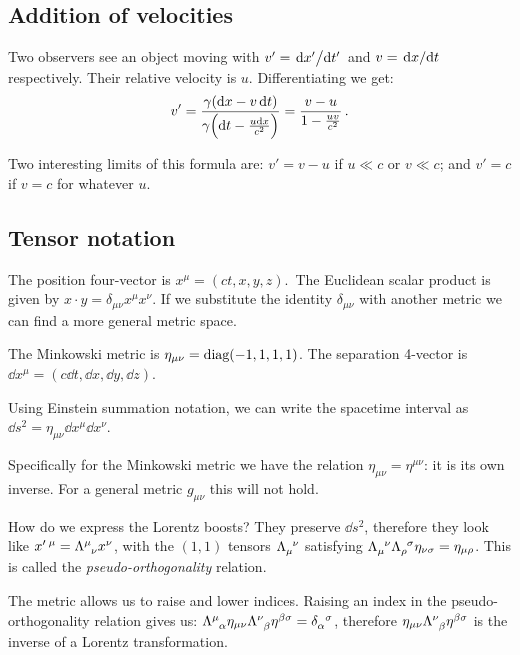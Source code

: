\documentclass[main.tex]{subfiles}
\begin{document}
\subsection{Addition of velocities}

Two observers see an object moving with \(v' = \dv*{x'}{t'}\) and  \(v = \dv*{x}{t}\) respectively. Their relative velocity is \(u\).
Differentiating we get:
%
\begin{equation}
  v' = \frac{\gamma (\dd{x} - v \dd{t})}{\gamma \qty(\dd{t} - \frac{u\dd{x}}{c^2} )} = \frac{v - u}{1 - \frac{uv}{c^2}}  \,.
\end{equation}

Two interesting limits of this formula are: \(v' = v - u\) if \(u \ll c\) or \(v \ll c\); and \(v'=c\) if \(v=c\) for whatever \(u\).

\subsection{Tensor notation}

The position four-vector is \(x^\mu = (ct, x, y, z)\).\
The Euclidean scalar product is given by \(x \cdot y = \delta_{\mu\nu} x^\mu x^\nu \).
If we substitute the identity \(\delta_{\mu\nu}\) with another metric we can find a more general metric space.

The Minkowski metric is \(\eta_{\mu\nu} = \text{diag}\qty(-1, 1, 1, 1)\).
The separation 4-vector is \(\dd{x^\mu} = (c\dd{t}, \dd{x}, \dd{y}, \dd{z})\).

Using Einstein summation notation, we can write the spacetime interval as \(\dd{s^2} = \eta_{\mu\nu} \dd{x^\mu} \dd{x^\nu}\).

Specifically for the Minkowski metric we have the relation \(\eta_{\mu\nu} = \eta^{\mu\nu}\): it is its own inverse.
For a general metric \(g_{\mu\nu}\) this will not hold.

How do we express the Lorentz boosts? They preserve \(\dd{s^2} \), therefore they look like \(x'\,^\mu = \tensor{\Lambda}{^\mu_\nu} x^\nu\), with the \((1, 1)\) tensors \(\tensor{\Lambda}{_\mu^\nu}\)  satisfying   \(\tensor{\Lambda}{_\mu^\nu}\tensor{\Lambda}{_\rho^\sigma} \eta_{\nu\sigma} = \eta_{\mu\rho}\). This is called the \emph{pseudo-orthogonality} relation.

The metric allows us to raise and lower indices. Raising an index in the pseudo-orthogonality relation gives us: \(\tensor{\Lambda}{^\mu_\alpha} \eta_{\mu\nu} \tensor{\Lambda}{^\nu_\beta} \eta^{\beta\sigma} =\tensor{\delta}{_\alpha ^\sigma}\), therefore  \(\eta_{\mu\nu} \tensor{\Lambda}{^\nu_\beta} \eta^{\beta\sigma}\) is the inverse of a Lorentz transformation.
\end{document}
